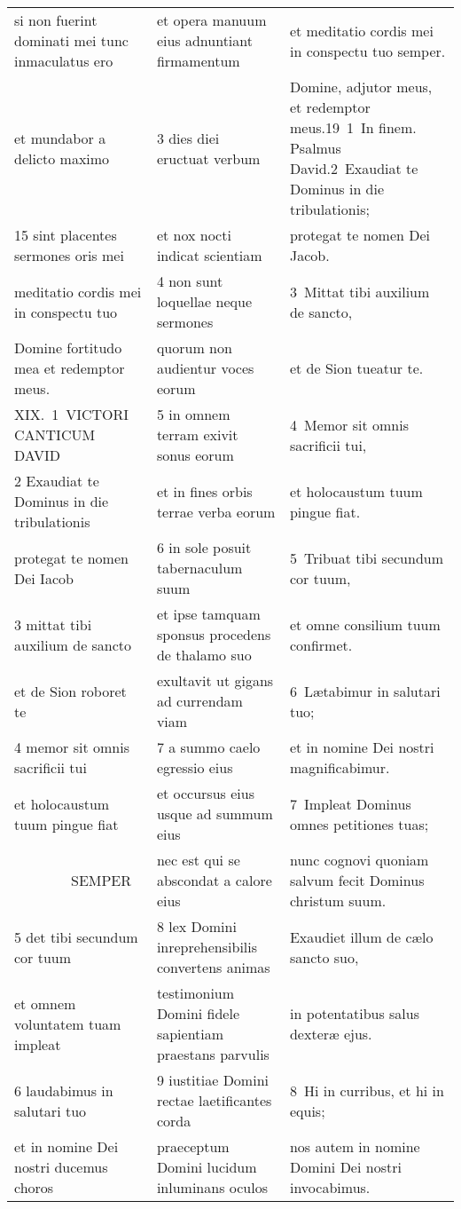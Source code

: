 \documentclass{article}
\begin{document}
\begin{longtable}{@{}p{}p{}p{}@{}}
si non fuerint dominati mei tunc inmaculatus ero	&	et opera manuum eius adnuntiant firmamentum	&	et meditatio cordis mei in conspectu tuo semper.	\\
et mundabor a delicto maximo	&	3 dies diei eructuat verbum	&	Domine, adjutor meus, et redemptor meus.19 1 In finem. Psalmus David.2 Exaudiat te Dominus in die tribulationis;	\\
15 sint placentes sermones oris mei	&	et nox nocti indicat scientiam	&	protegat te nomen Dei Jacob.	\\
meditatio cordis mei in conspectu tuo	&	4 non sunt loquellae neque sermones	&	3 Mittat tibi auxilium de sancto,	\\
Domine fortitudo mea et redemptor meus.	&	quorum non audientur voces eorum	&	et de Sion tueatur te.	\\
XIX. 1 VICTORI CANTICUM DAVID	&	5 in omnem terram exivit sonus eorum	&	4 Memor sit omnis sacrificii tui,	\\
2 Exaudiat te Dominus in die tribulationis	&	et in fines orbis terrae verba eorum	&	et holocaustum tuum pingue fiat.	\\
protegat te nomen Dei Iacob	&	6 in sole posuit tabernaculum suum	&	5 Tribuat tibi secundum cor tuum,	\\
3 mittat tibi auxilium de sancto	&	et ipse tamquam sponsus procedens de thalamo suo	&	et omne consilium tuum confirmet.	\\
et de Sion roboret te	&	exultavit ut gigans ad currendam viam	&	6 Lætabimur in salutari tuo;	\\
4 memor sit omnis sacrificii tui	&	7 a summo caelo egressio eius	&	et in nomine Dei nostri magnificabimur.	\\
et holocaustum tuum pingue fiat	&	et occursus eius usque ad summum eius	&	7 Impleat Dominus omnes petitiones tuas;	\\
    SEMPER	&	nec est qui se abscondat a calore eius	&	nunc cognovi quoniam salvum fecit Dominus christum suum.	\\
5 det tibi secundum cor tuum	&	8 lex Domini inreprehensibilis convertens animas	&	Exaudiet illum de cælo sancto suo,	\\
et omnem voluntatem tuam impleat	&	testimonium Domini fidele sapientiam praestans parvulis	&	in potentatibus salus dexteræ ejus.	\\
6 laudabimus in salutari tuo	&	9 iustitiae Domini rectae laetificantes corda	&	8 Hi in curribus, et hi in equis;	\\
et in nomine Dei nostri ducemus choros	&	praeceptum Domini lucidum inluminans oculos	&	nos autem in nomine Domini Dei nostri invocabimus.	\\

\end{longtable}
\end{document}
